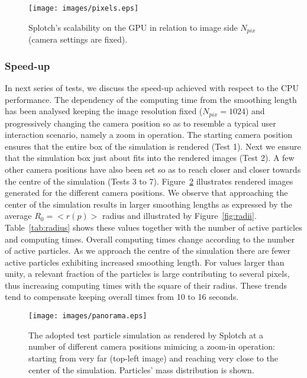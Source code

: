 \documentclass[1p]{elsarticle}
\begin{document}
\begin{figure}
\centering
\texttt{[image: images/pixels.eps]}
\caption{Splotch's scalability on the GPU in relation to image side $N_{pix}$ (camera settings are fixed).}
\label{fig:pixels}
\end{figure}
\subsubsection{Speed-up}
\label{sec:speed-up}
In next series of tests, we discuss the speed-up achieved with respect to the CPU performance. The dependency of the computing time from the smoothing length has been analysed keeping the image resolution fixed ($N_{pix} = 1024$) and progressively changing the camera position so as to resemble a typical user interaction scenario, namely a zoom in operation. The starting camera position ensures that the entire box of the simulation is rendered (Test 1). Next we ensure that the simulation box just about fits into the rendered images (Test 2). A few other camera positions have also been set so as to reach closer and closer towards the centre of the simulation (Tests 3 to 7). Figure~\ref{fig:panorama} illustrates rendered images generated for the different camera positions.
We observe that approaching the center of the simulation results in larger smoothing lengths as expressed by the average $R_0=<r(p)>$ radius and illustrated by Figure~\ref{fig:radii}. Table~\ref{tab:radius} shows these values together with the number of active particles and computing times. 
Overall computing times change according to the number of active particles. As we approach the centre of the simulation there are fewer active particles exhibiting increased smoothing length. For values larger than unity, a relevant fraction of the particles is large contributing to several pixels, thus increasing computing times with the square of their radius. These trends tend to compensate keeping overall times from 10 to 16 seconds.
\begin{figure}
\centering
\texttt{[image: images/panorama.eps]}
\caption{The adopted test particle simulation as rendered by Splotch at a number of different camera positions mimicing a zoom-in operation: starting from very far (top-left image) and reaching very close to the center of the simulation. Particles' mass distribution is shown.}
\label{fig:panorama}
\end{figure}
\end{document}
